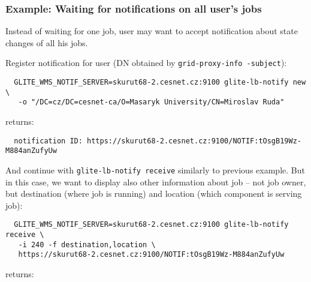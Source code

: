 \subsubsection{Example: Waiting for notifications on all user's jobs}

Instead of waiting for one job, user may want to accept notification about 
state changes of all his jobs.

Register notification for user (DN obtained by \verb'grid-proxy-info -subject'):
\begin{verbatim}
  GLITE_WMS_NOTIF_SERVER=skurut68-2.cesnet.cz:9100 glite-lb-notify new \
   -o "/DC=cz/DC=cesnet-ca/O=Masaryk University/CN=Miroslav Ruda"
\end{verbatim}

returns:

\begin{verbatim}
  notification ID: https://skurut68-2.cesnet.cz:9100/NOTIF:tOsgB19Wz-M884anZufyUw 
\end{verbatim}

And continue with \verb'glite-lb-notify receive' similarly to previous example.
But in this case, we want to display also other information about job --
not job owner, but destination (where job is running) and location (which component is 
serving job):

\begin{verbatim}
  GLITE_WMS_NOTIF_SERVER=skurut68-2.cesnet.cz:9100 glite-lb-notify receive \
   -i 240 -f destination,location \
   https://skurut68-2.cesnet.cz:9100/NOTIF:tOsgB19Wz-M884anZufyUw
\end{verbatim}

returns:

